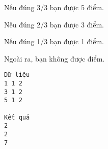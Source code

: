 Nếu đúng 3/3 bạn được 5 điểm.

Nếu đúng 2/3 bạn được 3 điểm.

Nếu đúng 1/3 bạn được 1 điểm.

Ngoài ra, bạn không được điểm.
\begin{verbatim}
Dữ liệu
1 1 2
3 1 2
5 1 2

Kết quả
2
2
7
\end{verbatim}